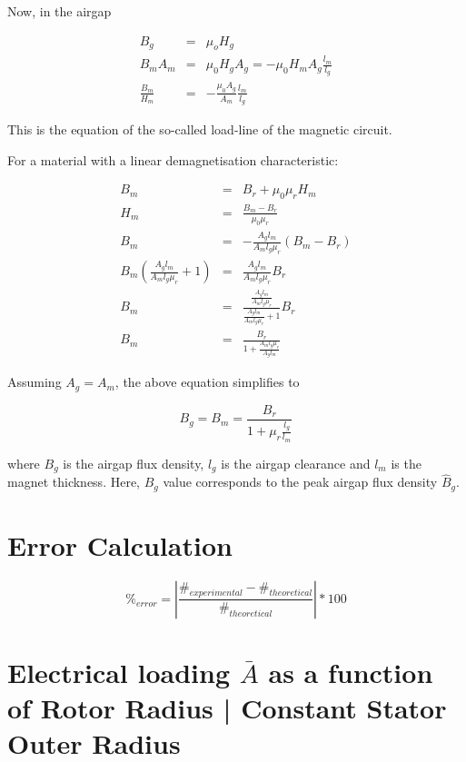 \documentclass[a4paper, 11pt, titlepage]{article}
\begin{document}
Now, in the airgap

\begin{eqnarray}
	B_g &=& \mu_oH_g \\
	B_mA_m &=& \mu_0H_gA_g=-\mu_0H_mA_g\frac{l_m}{l_g} \\
	\frac{B_m}{H_m} &=& -\frac{\mu_0A_g}{A_m}\frac{l_m}{l_g}
	\label{label:loadLine}
\end{eqnarray}

This is the equation of the so-called load-line of the magnetic circuit. 

For a material with a linear demagnetisation characteristic:

\begin{eqnarray}
	B_m &=& B_r + \mu_0\mu_rH_m \\
	H_m &=& \frac{B_m-B_r}{\mu_0\mu_r} \\
	B_m &=& -\frac{A_gl_m}{A_ml_g\mu_r}(B_m-B_r) \\
	B_m(\frac{A_gl_m}{A_ml_g\mu_r}+1) &=& \frac{A_gl_m}{A_ml_g\mu_r}B_r \\
	B_m &=& \frac{\frac{A_gl_m}{A_ml_g\mu_r}}{\frac{A_gl_m}{A_ml_g\mu_r}+1}B_r \\
	B_m &=& \frac{B_r}{1+\frac{A_ml_g\mu_r}{A_gl_m}}
	\label{label:demagnetizationCharacteristics}
\end{eqnarray}

Assuming $A_g = A_m$, the above equation simplifies to

\begin{equation}
	B_g = B_m = \frac{B_r}{1+\mu_r\frac{l_g}{l_m}}
\end{equation}

where $B_g$ is the airgap flux density, $l_g$ is the airgap clearance and $l_m$ is the magnet thickness. Here, $B_g$ value corresponds to the peak airgap flux density $\hat{B}_g$. 


\section{Error Calculation}
\label{app:errorCalculation}


\begin{equation}
	\%_{error}=|\frac{\#_{experimental}-\#_{theoretical}}{\#_{theoretical}}|*100
	\label{eq:errorCalculation}
\end{equation}


\section{Electrical loading $\bar{A}$ as a function of Rotor Radius | Constant Stator Outer Radius}
\label{app:torquevsRotorRadius}
\end{document}
